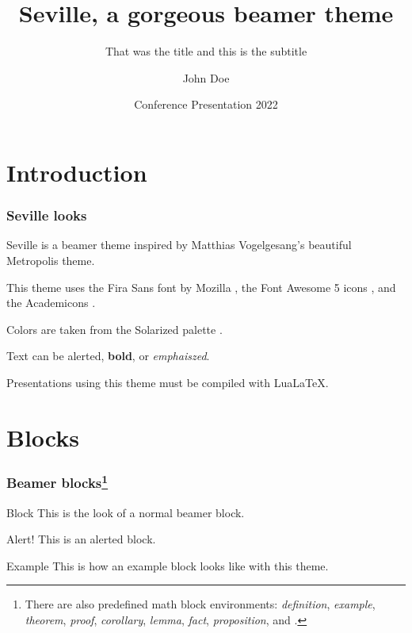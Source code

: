 \documentclass{beamer}
\title{Seville, a gorgeous beamer theme}
\subtitle{That was the title and this is the subtitle}
\author{John Doe}
\date{Conference Presentation 2022}
\institute{University of \LaTeX}
\begin{document}





\begin{frame}

    \titlepage

\end{frame}

\section{Introduction}

\begin{frame}
    \frametitle{Seville looks}

    Seville is a beamer theme inspired by Matthias Vogelgesang's beautiful Metropolis theme.

    This theme uses the Fira Sans font by Mozilla \faFirefoxBrowser, the Font Awesome 5 icons \faFontAwesome, and the Academicons \aiAcademiaSquare.

    Colors are taken from the Solarized palette \faPalette.

    Text can be \alert{alerted}, \textbf{bold}, or \emph{emphaiszed}.

    Presentations using this theme must be compiled with Lua\LaTeX.

\end{frame}

\section{Blocks}

\begin{frame}
    \frametitle{Beamer blocks\footnote{There are also predefined math block environments: \emph{definition}, \emph{example}, \emph{theorem}, \emph{proof}, \emph{corollary}, \emph{lemma}, \emph{fact}, \emph{proposition}, and     .}}

    \begin{block}{Block}
        This is the look of a normal beamer block.
    \end{block}

    \begin{alertblock}{Alert!}
        This is an alerted block.
    \end{alertblock}

    \begin{exampleblock}{Example}
        This is how an example block looks like with this theme.
    \end{exampleblock}

\end{frame}
\end{document}
